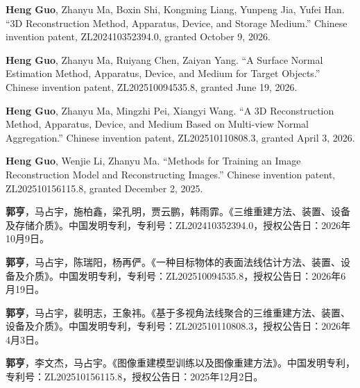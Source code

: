 \begin{enumerate}[label={[\arabic*]}]
\ifdefined\patentenglish
  \item \textbf{Heng Guo}, Zhanyu Ma, Boxin Shi, Kongming Liang, Yunpeng Jia, Yufei Han. ``3D Reconstruction Method, Apparatus, Device, and Storage Medium.'' Chinese invention patent, ZL202410352394.0, granted October 9, 2026.
  \item \textbf{Heng Guo}, Zhanyu Ma, Ruiyang Chen, Zaiyan Yang. ``A Surface Normal Estimation Method, Apparatus, Device, and Medium for Target Objects.'' Chinese invention patent, ZL202510094535.8, granted June 19, 2026.
  \item \textbf{Heng Guo}, Zhanyu Ma, Mingzhi Pei, Xiangyi Wang. ``A 3D Reconstruction Method, Apparatus, Device, and Medium Based on Multi-view Normal Aggregation.'' Chinese invention patent, ZL202510110808.3, granted April 3, 2026.
  \item \textbf{Heng Guo}, Wenjie Li, Zhanyu Ma. ``Methods for Training an Image Reconstruction Model and Reconstructing Images.'' Chinese invention patent, ZL202510156115.8, granted December 2, 2025.
\else
  \item \textbf{郭亨}，马占宇，施柏鑫，梁孔明，贾云鹏，韩雨霏。《三维重建方法、装置、设备及存储介质》。中国发明专利，专利号：ZL202410352394.0，授权公告日：2026年10月9日。
  \item \textbf{郭亨}，马占宇，陈瑞阳，杨再俨。《一种目标物体的表面法线估计方法、装置、设备及介质》。中国发明专利，专利号：ZL202510094535.8，授权公告日：2026年6月19日。
  \item \textbf{郭亨}，马占宇，裴明志，王象祎。《基于多视角法线聚合的三维重建方法、装置、设备及介质》。中国发明专利，专利号：ZL202510110808.3，授权公告日：2026年4月3日。
  \item \textbf{郭亨}，李文杰，马占宇。《图像重建模型训练以及图像重建方法》。中国发明专利，专利号：ZL202510156115.8，授权公告日：2025年12月2日。
\fi
\end{enumerate}
